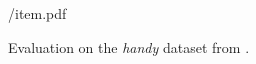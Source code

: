 \begin{figure}[b]
\centering
\begin{overpic} 
[width=\linewidth]
{\currfiledir/item.pdf}
\myfigurename{}
\end{overpic}
\caption{
% 
Evaluation on the \emph{handy} dataset from \protect\cite{tkach2016sphere}.
% 
}
\label{fig:evalhandy}
\end{figure}
